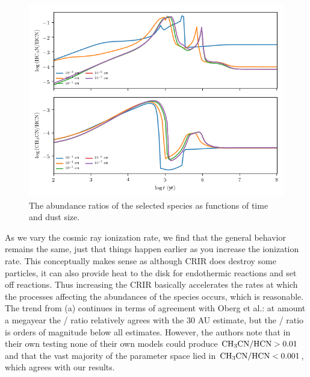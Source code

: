 \documentclass[11pt]{article}
\newenvironment{tight_enumerate}{
    \begin{enumerate}[label=(\alph*)]
    \setlength{\itemsep}{3pt}
    \setlength{\parskip}{0pt}}
    {\end{enumerate}}
\begin{document}
\begin{tight_enumerate}
\begin{figure}[H]
\includegraphics[height=0.45\textheight]{b/s_ratios.png}
\caption{The abundance ratios of the selected species as functions of time and dust size.}
\end{figure}

\newpage
\item As we vary the cosmic ray ionization rate, we find that the general behavior remains the same, just that things happen earlier as you increase the ionization rate. This conceptually makes sense as although CRIR does destroy some particles, it can also provide heat to the disk for endothermic reactions and set off reactions. Thus increasing the CRIR basically accelerates the rates at which the processes affecting the abundances of the species occurs, which is reasonable. The trend from (a) continues in terms of agreement with Oberg et al.: at amount a megayear the / ratio relatively agrees with the $30$ \si{AU} estimate, but the / ratio is orders of magnitude below all estimates. However, the authors note that in their own testing none of their own models could produce $\ce{CH3CN}/\ce{HCN} > 0.01$ and that the vast majority of the parameter space lied in $\ce{CH3CN}/\ce{HCN} < 0.001$, which agrees with our results. 


\end{tight_enumerate}
\end{document}

